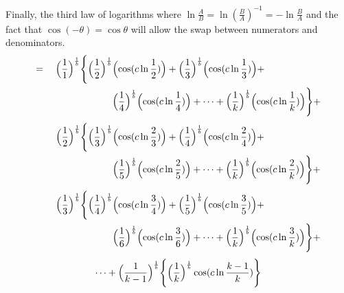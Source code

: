 \documentclass{amsart}
\begin{document}
	Finally, the third law of logarithms where $\ln\frac{A}{B} = \ln(\frac{B}{A})^{-1} = -\ln\frac{B}{A}$ and the fact that $\cos(-\theta) = \cos\theta$ will allow the swap between numerators and denominators.
	\[
	\begin{aligned}
		= \quad \Bigl( \frac{1}{1} \Bigr)^\frac1b \Biggl\{ \Bigl( \frac{1}{2} \Bigr)^\frac1b & \Bigl( \cos(c \ln \frac{1}{2}) \Bigr) + \Bigl( \frac{1}{3} \Bigr)^\frac1b \Bigl( \cos(c \ln \frac{1}{3}) \Bigr) + \\
		& \Bigl( \frac{1}{4} \Bigr)^\frac1b \Bigl( \cos(c \ln \frac{1}{4}) \Bigr) + \dots  + \Bigl( \frac{1}{k} \Bigr)^\frac1b \Bigl( \cos(c \ln \frac{1}{k}) \Bigr) \Biggr\} + 
	\end{aligned}
	\]
	\[
	\begin{aligned}
		\quad\quad \Bigl( \frac{1}{2}  \Bigr)^\frac1b \Biggl\{ \Bigl( \frac{1}{3} \Bigr)^\frac1b & \Bigl( \cos(c \ln \frac{2}{3}) \Bigr) + \Bigl( \frac{1}{4} \Bigr)^\frac1b \Bigl( \cos(c \ln \frac{2}{4}) \Bigr) + \\
		& \Bigl( \frac{1}{5} \Bigr)^\frac1b \Bigl( \cos(c \ln \frac{2}{5}) \Bigr) + \dots  + \Bigl( \frac{1}{k} \Bigr)^\frac1b \Bigl( \cos(c \ln \frac{2}{k}) \Bigr) \Biggr\} + 
	\end{aligned}
	\]
	\[
	\begin{aligned}
		\quad\quad \Bigl( \frac{1}{3} \Bigr)^\frac1b \Biggl\{ \Bigl( \frac{1}{4} \Bigr)^\frac1b & \Bigl( \cos(c \ln \frac{3}{4}) \Bigr) + \Bigl( \frac{1}{5} \Bigr)^\frac1b \Bigl( \cos(c \ln \frac{3}{5}) \Bigr) + \\
		& \Bigl( \frac{1}{6} \Bigr)^\frac1b \Bigl( \cos(c \ln \frac{3}{6}) \Bigr) + \dots  + \Bigl( \frac{1}{k} \Bigr)^\frac1b \Bigl( \cos(c \ln \frac{3}{k}) \Bigr) \Biggr\} + 
	\end{aligned}
	\]
	\[ \dots + \Bigl( \frac{1}{k-1} \Bigr)^\frac1b \Biggl\{ \Bigl( \frac{1}{k} \Bigr)^\frac1b \cos(c \ln \frac{k-1}{k}) \Biggr\} \]
	
	
	
	
	\[\]
	
\end{document}
